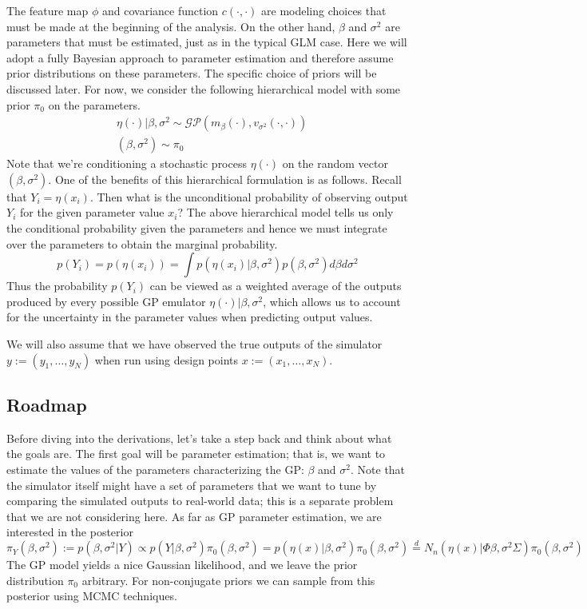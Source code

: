 \documentclass[12pt]{article}
\begin{document}
The feature map $\phi$ and covariance function $c(\cdot, \cdot)$ are modeling choices that must be made at the beginning of the analysis. On the other hand, $\beta$ and $\sigma^2$ are parameters
that must be estimated, just as in the typical GLM case. Here we will adopt a fully Bayesian approach to parameter estimation and therefore assume prior distributions on these parameters. The specific 
choice of priors will be discussed later. For now, we consider the following hierarchical model with some prior $\pi_0$ on the parameters. 
\begin{align*}
&\eta(\cdot)|\beta, \sigma^2 \sim \mathcal{GP}(m_\beta (\cdot), v_{\sigma^2}(\cdot, \cdot)) \\
&(\beta, \sigma^2) \sim \pi_0
\end{align*}
Note that we're conditioning a stochastic process $\eta(\cdot)$ on the random vector $(\beta, \sigma^2)$. One of the benefits of this hierarchical formulation is as follows. Recall that $Y_i = \eta(x_i)$. Then 
what is the unconditional probability of observing output $Y_i$ for the given parameter value $x_i$? The above hierarchical model tells us only the conditional probability given the parameters 
and hence we must integrate over the parameters to obtain the marginal probability. 
\[p(Y_i) = p(\eta(x_i)) = \int p(\eta(x_i)|\beta, \sigma^2)p(\beta, \sigma^2) d\beta d\sigma^2\]
Thus the probability $p(Y_i)$ can be viewed as a weighted average of the outputs produced by every possible GP emulator $\eta(\cdot)|\beta, \sigma^2$, which allows us to account for the 
uncertainty in the parameter values when predicting output values. 

We will also assume that we have observed the true outputs of the simulator $y := (y_1, \dots, y_N)$ when run using design points $x := (x_1, \dots, x_N)$.

\subsection{Roadmap}
Before diving into the derivations, let's take a step back and think about what the goals are. The first goal will be parameter estimation; that is, we want to estimate the values of 
the parameters characterizing the GP: $\beta$ and $\sigma^2$. Note that the simulator itself might have a set of parameters that we want to tune by comparing the simulated outputs 
to real-world data; this is a separate problem that we are not considering here. As far as GP parameter estimation, we are interested in the posterior 
\[\pi_Y(\beta, \sigma^2) := p(\beta, \sigma^2|Y) \propto p(Y|\beta, \sigma^2)\pi_0(\beta, \sigma^2) = p(\eta(x)|\beta, \sigma^2)\pi_0(\beta, \sigma^2) \overset{d}{=} N_n(\eta(x)|\Phi \beta, \sigma^2 \Sigma)\pi_0(\beta, \sigma^2) \]
The GP model yields a nice Gaussian likelihood, and we leave the prior distribution $\pi_0$ arbitrary. For non-conjugate priors we can 
sample from this posterior using MCMC techniques. 
\end{document}
